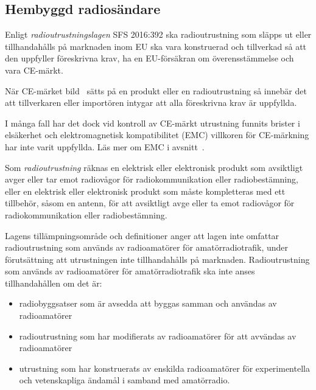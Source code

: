 \newpage
{} 

\subsection{Hembyggd radiosändare}
\label{hembyggd radiosandare}
\label{radioutrustningslagen}

Enligt \emph{radioutrustningslagen} SFS 2016:392 \cite{SFS2016:392} ska
radioutrustning som släpps ut eller tillhandahålls på marknaden inom EU ska vara
konstruerad och tillverkad så att den uppfyller föreskrivna krav, ha en
EU-försäkran om överensstämmelse och vara CE-märkt.

När CE-märket bild~ sätts på en produkt eller en
radioutrustning så innebär det att tillverkaren eller importören intygar att
alla föreskrivna krav är uppfyllda.

I många fall har det dock vid kontroll av CE-märkt utrustning funnits brister
i elsäkerhet och elektromagnetisk kompatibilitet (EMC) villkoren för CE-märkning
har inte varit uppfyllda. Läs mer om EMC i avsnitt~.

Som \emph{radioutrustning} räknas en elektrisk eller elektronisk produkt som
avsiktligt avger eller tar emot radiovågor för radiokommunikation eller
radiobestämning, eller en elektrisk eller elektronisk produkt som måste
kompletteras med ett tillbehör, såsom en antenn, för att avsiktligt avge
eller ta emot radiovågor för radiokommunikation eller radiobestämning.

Lagens tillämpningsområde och definitioner anger att lagen inte omfattar
radioutrustning som används av radioamatörer för amatörradiotrafik, under
förutsättning att utrustningen inte tillhandahålls på marknaden.
Radioutrustning som används av radioamatörer för amatörradiotrafik ska inte
anses tillhandahållen om det är:

\begin{itemize}
	\item radiobyggsatser som är avsedda att byggas samman och användas av
	radioamatörer
	\item radioutrustning som har modifierats av radioamatörer för att
	avvändas av radioamatörer
	\item utrustning som har konstruerats av enskilda radioamatörer för
	experimentella och vetenskapliga ändamål i samband med amatörradio.
\end{itemize}

